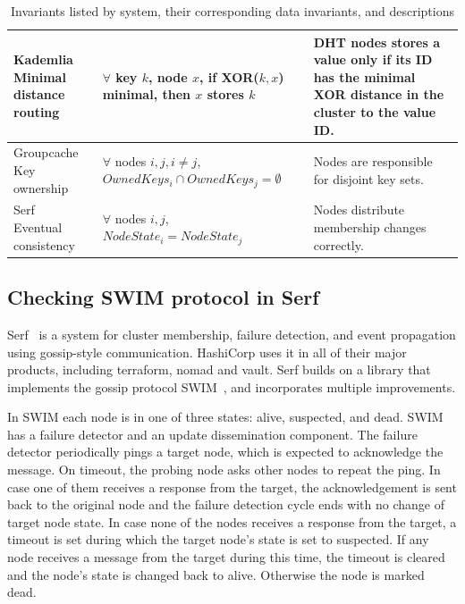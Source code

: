 \begin{table}[t]
\begin{tabular}{ p{3.7cm}  p{6cm}  p{5cm} }
            \firstcolcell{Kademlia\\ Minimal distance routing} &
            \pbox{6cm}{$\forall$ key $k$, node $x$,\\if XOR($k,x$) minimal, then $x$ stores $k$}
             &
            DHT nodes stores a value only if its ID has the minimal XOR distance in the cluster to the value ID. \\
            \midrule
            \midrule
            \firstcolcell{Groupcache\\ Key ownership} &
            \pbox{6cm}{$\forall$ nodes $i,j, i \neq j$,\\ $OwnedKeys_i \cap OwnedKeys_j = \emptyset$} &
            Nodes are responsible for disjoint key sets. \\
            \midrule
            \midrule
            \firstcolcell{Serf\\ Eventual consistency} &
            $\forall$ nodes $i,j$, $NodeState_i = NodeState_j$ &
            Nodes distribute membership changes correctly. \\
            \bottomrule
        \end{tabular}
        \caption{Invariants listed by system, their corresponding data invariants, and descriptions}
        \label{table:invariant-table}
    \end{table}

\subsection{Checking SWIM protocol in Serf}
Serf~\cite{serf} is a system for cluster membership, failure
detection, and event propagation using gossip-style communication.
HashiCorp uses it in all of their major products, including terraform,
nomad and vault. Serf builds on a library that implements the gossip
protocol SWIM~\cite{das2002swim}, and incorporates multiple
improvements.

In SWIM each node is in one of three states: alive, suspected, and
dead. SWIM has a failure detector and an update dissemination
component. The failure detector periodically pings a target node,
which is expected to acknowledge the message. On timeout, the probing
node asks other nodes to repeat the ping. In case one of them receives
a response from the target, the acknowledgement is sent back to the
original node and the failure detection cycle ends with no change of
target node state. In case none of the nodes receives a response from
the target, a timeout is set during which the target node's state is
set to suspected. If any node receives a message from the target
during this time, the timeout is cleared and the node's state is
changed back to alive. Otherwise the node is marked dead.

